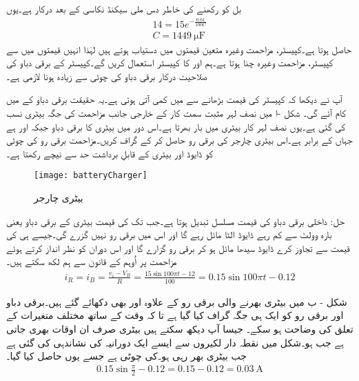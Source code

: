 بل کو  رکھنے کی خاطر دس ملی سیکنڈ نکاسی کے بعد  درکار ہے۔یوں
\begin{align*}
14=15 e^{-\frac{0.01}{100 C}}\\
C=\SI{1449}{\micro \farad}
\end{align*}
حاصل ہوتا ہے۔کپیسٹر، مزاحمت وغیرہ متعین قیمتوں میں دستیاب ہوتے ہیں لہٰذا انہیں قیمتوں میں سے کپیسٹر، مزاحمت وغیرہ چنا ہوتا ہے۔ہم  اور  کا کپیسٹر استعمال کریں گے۔کپیسٹر کے برقی دباو کی صلاحیت درکار برقی دباو کی چوٹی سے زیادہ ہونا لازمی ہے۔ 

آپ نے دیکھا کہ کپیسٹر کی قیمت بڑھانے سے  میں کمی آتی ہوتی ہے۔یہ حقیقت برقی دباو کے  میں کام آئے گی۔
شکل -ا میں نصف لہر مثبت سمت کار کے خارجی جانب مزاحمت کی جگہ  بیٹری نسب کی گئی ہے۔یوں نصف لہر کار بیٹری میں بار بھرتا ہے۔اس دور میں بیٹری کا برقی دباو  جبکہ  اور  ہے جہاں  کے برابر ہے۔اس بیٹری چارجر کی برقی رو  حاصل کر کے گراف کریں۔مزاحمت  برقی رو کی چوٹی کو ڈایوڈ اور بیٹری کے قابلِ برداشت حد سے نیچے رکھتا ہے۔
\begin{figure}
\centering
\texttt{[image: batteryCharger]}
\caption{بیٹری چارجر}
\label{شکل_بیٹری_چارجر}
\end{figure}
حل:	داخلی برقی دباو  کی قیمت مسلسل تبدیل ہوتا ہے۔جب تک  کی قیمت بیٹری کے برقی دباو یعنی بارہ وولٹ سے کم رہے ڈایوڈ الٹا مائل رہے گا اور اس میں برقی رو نہیں گزرے گی۔جیسے ہی  کی قیمت   سے تجاوز کرے ڈایوڈ سیدھا مائل ہو کر برقی رو گزارے گا اور اس دوران   کو نظر انداز کرتے ہوئے مزاحمت پر  اُوہم کے قانون سے ہم لکھ سکتے ہیں۔
\begin{align*}
i_R=i_B=\frac{v_i-V_B}{R}=\frac{15 \sin 100 \pi t -12 }{100}=0.15 \sin  100 \pi t -0.12
\end{align*}

شکل   - ب میں بیٹری بھرنے والی برقی رو  کے علاوہ  اور  بھی دکھائے گئے ہیں۔برقی دباو اور برقی رو کو ایک ہی جگہ گراف کیا گیا ہے تا کہ وقت  کے ساتھ مختلف متغیرات کے تعلق کی وضاحت ہو سکے۔ جیسا آپ دیکھ سکتے ہیں بیٹری صرف ان اوقات بھری جاتی ہے جب  ہو۔شکل میں نقطہ دار لکیروں سے ایسے ایک دورانیہ کی نشاندہی کی گئی ہے  جب بیٹری بھر رہی ہو۔کی چوٹی  ہے جسے  یوں حاصل کیا گیا۔
\begin{align*}
0.15 \sin \frac{\pi}{2}-0.12=0.15-0.12=\SI{0.03}{\ampere}
\end{align*}

